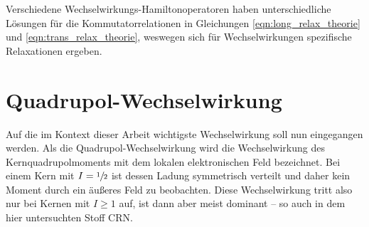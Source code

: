 Verschiedene Wechselwirkungs-Hamiltonoperatoren haben unterschiedliche Lösungen für die Kommutatorrelationen in Gleichungen \eqref{eqn:long_relax_theorie} und \eqref{eqn:trans_relax_theorie}, weswegen sich für Wechselwirkungen spezifische Relaxationen ergeben.





\section{Quadrupol-Wechselwirkung} \label{section:theo:qww}

Auf die im Kontext dieser Arbeit wichtigste Wechselwirkung soll nun eingegangen werden. Als die Quadrupol-Wechselwirkung wird die Wechselwirkung des Kernquadrupolmoments mit dem lokalen elektronischen Feld bezeichnet. Bei einem Kern mit $I = \sfrac{1}{2}$ ist dessen Ladung symmetrisch verteilt und daher kein Moment durch ein äußeres Feld zu beobachten. Diese Wechselwirkung tritt also nur bei Kernen mit $I \ge 1$ auf, ist dann aber meist dominant -- so auch in dem hier untersuchten Stoff CRN.


